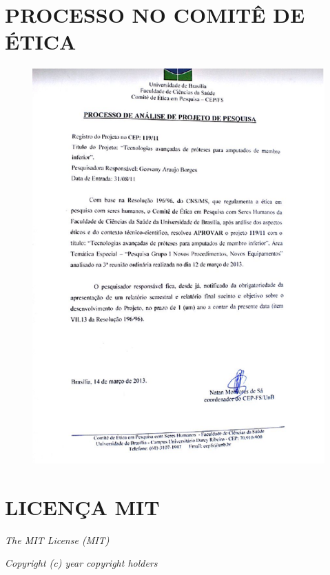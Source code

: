 \begin{anexosenv}
\partanexos
\chapter{PROCESSO NO COMITÊ DE ÉTICA}
\label{comite_sec}
\begin{figure}[ht]
	\centering
	\includegraphics[width=17cm]{figuras/comite.eps}
\label{comite}
\end{figure}

\chapter{LICENÇA MIT}
\label{licenca_mit}
\newpage
\emph{The MIT License (MIT)}

\emph{Copyright (c) year copyright holders}


\end{anexosenv}
